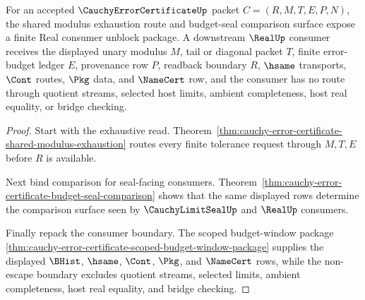 \begin{theorem}
\label{thm:cauchy-error-certificate-real-consumer-unblock}
For an accepted $\CauchyErrorCertificateUp$ packet $C=(R,M,T,E,P,N)$, the shared modulus exhaustion route and budget-seal comparison surface expose a finite Real consumer unblock package. A downstream $\RealUp$ consumer receives the displayed unary modulus $M$, tail or diagonal packet $T$, finite error-budget ledger $E$, provenance row $P$, readback boundary $R$, $\hsame$ transports, $\Cont$ routes, $\Pkg$ data, and $\NameCert$ row, and the consumer has no route through quotient streams, selected host limits, ambient completeness, host real equality, or bridge checking.
\end{theorem}
\begin{proof}
Start with the exhaustive read. Theorem~\ref{thm:cauchy-error-certificate-shared-modulus-exhaustion} routes every finite tolerance request through $M,T,E$ before $R$ is available.

Next bind comparison for seal-facing consumers. Theorem~\ref{thm:cauchy-error-certificate-budget-seal-comparison} shows that the same displayed rows determine the comparison surface seen by $\CauchyLimitSealUp$ and $\RealUp$ consumers.

Finally repack the consumer boundary. The scoped budget-window package \autoref{thm:cauchy-error-certificate-scoped-budget-window-package} supplies the displayed $\BHist$, $\hsame$, $\Cont$, $\Pkg$, and $\NameCert$ rows, while the non-escape boundary excludes quotient streams, selected limits, ambient completeness, host real equality, and bridge checking.
\end{proof}

